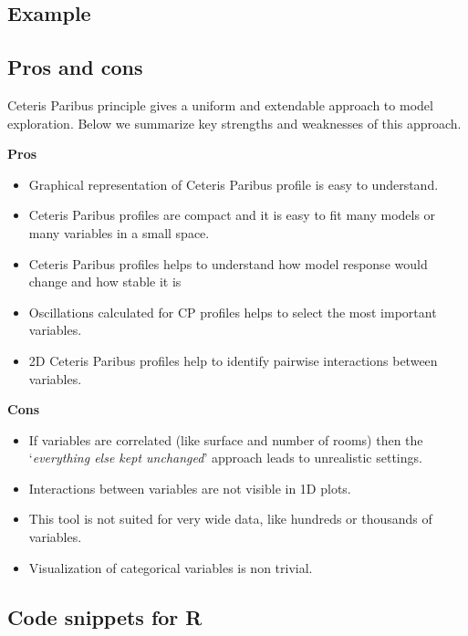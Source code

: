 \documentclass[]{krantz}
\providecommand{\tightlist}{%
  \setlength{\itemsep}{0pt}\setlength{\parskip}{0pt}}
\theoremstyle{definition}
\theoremstyle{definition}
\theoremstyle{definition}
\theoremstyle{remark}
\begin{document}
\hypertarget{example}{%
\subsection{Example}\label{example}}

\hypertarget{pros-and-cons-5}{%
\subsection{Pros and cons}\label{pros-and-cons-5}}

Ceteris Paribus principle gives a uniform and extendable approach to
model exploration. Below we summarize key strengths and weaknesses of
this approach.

\textbf{Pros}

\begin{itemize}
\tightlist
\item
  Graphical representation of Ceteris Paribus profile is easy to
  understand.
\item
  Ceteris Paribus profiles are compact and it is easy to fit many models
  or many variables in a small space.
\item
  Ceteris Paribus profiles helps to understand how model response would
  change and how stable it is
\item
  Oscillations calculated for CP profiles helps to select the most
  important variables.
\item
  2D Ceteris Paribus profiles help to identify pairwise interactions
  between variables.
\end{itemize}

\textbf{Cons}

\begin{itemize}
\tightlist
\item
  If variables are correlated (like surface and number of rooms) then
  the `\emph{everything else kept unchanged}' approach leads to
  unrealistic settings.
\item
  Interactions between variables are not visible in 1D plots.
\item
  This tool is not suited for very wide data, like hundreds or thousands
  of variables.
\item
  Visualization of categorical variables is non trivial.
\end{itemize}

\hypertarget{code-snippets-for-r-4}{%
\subsection{Code snippets for R}\label{code-snippets-for-r-4}}
\end{document}
